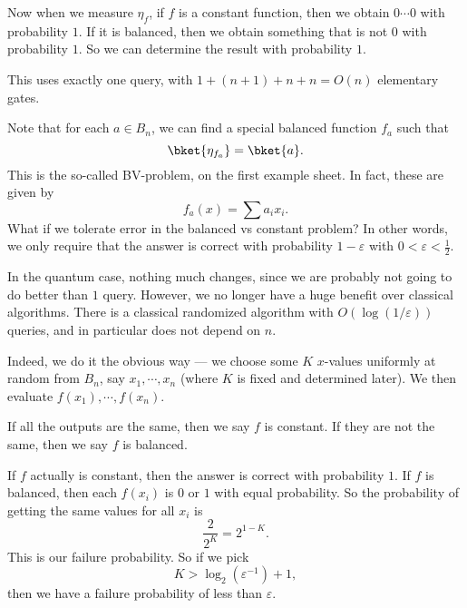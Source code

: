 \documentclass[a4paper]{article}
\makeatletter
\DeclareRobustCommand{\rvdots}{%
  \vbox{
    \baselineskip4\p@\lineskiplimit\z@
    \kern-\p@
    \hbox{.}\hbox{.}\hbox{.}
  }
}
\newcommand\addstate[3]{
  \pgfmathsetmacro{\y@y}{-#2 * 0.7};
  \pgfmathsetmacro{\x@x}{#3};
  \node [left] at (0, \y@y) {#1};
  \draw (0, \y@y) -- (\x@x, \y@y);
}
\newcommand\addoperator[3]{
  \node [draw, rectangle, fill=white] at (#3, -#2 * 0.7) {#1};
}
\newcommand\addbigoperator[5]{
  \pgfmathsetmacro{\y@s}{-#2 * 0.7 + 0.2};
  \pgfmathsetmacro{\y@t}{-#3 * 0.7 - 0.2};
  \pgfmathsetmacro{\x@s}{#4};
  \pgfmathsetmacro{\x@t}{#5};
  \pgfmathsetmacro{\x@c}{(\x@s + \x@t)/2};
  \pgfmathsetmacro{\y@c}{(\y@s + \y@t)/2};

  \draw [fill=white] (\x@s, \y@s) rectangle (\x@t, \y@t);
  \node at (\x@c, \y@c) {#1};
}
\makeatother
\begin{document}
\begin{eg}
  Now when we measure $\eta_f$, if $f$ is a constant function, then we obtain $0\cdots0$ with probability $1$. If it is balanced, then we obtain something that is not $0$ with probability $1$. So we can determine the result with probability $1$.
  \begin{center}
  \end{center}
  This uses exactly one query, with $1 + (n + 1) + n + n = O(n)$ elementary gates.

  Note that for each $a \in B_n$, we can find a special balanced function $f_a$ such that
  \[
    \bket{\eta_{f_a}} = \bket{a}.
  \]
  This is the so-called BV-problem, on the first example sheet. In fact, these are given by
  \[
    f_a(x) = \sum a_i x_i.
  \]
  What if we tolerate error in the balanced vs constant problem? In other words, we only require that the answer is correct with probability $1 - \varepsilon$ with $0 < \varepsilon < \frac{1}{2}$.

  In the quantum case, nothing much changes, since we are probably not going to do better than $1$ query. However, we no longer have a huge benefit over classical algorithms. There is a classical randomized algorithm with $O(\log(1/\varepsilon))$ queries, and in particular does not depend on $n$.

  Indeed, we do it the obvious way --- we choose some $K$ $x$-values uniformly at random from $B_n$, say $x_1, \cdots, x_n$ (where $K$ is fixed and determined later). We then evaluate $f(x_1), \cdots, f(x_n)$.

  If all the outputs are the same, then we say $f$ is constant. If they are not the same, then we say $f$ is balanced.

  If $f$ actually is constant, then the answer is correct with probability $1$. If $f$ is balanced, then each $f(x_i)$ is $0$ or $1$ with equal probability. So the probability of getting the same values for all $x_i$ is
  \[
    \frac{2}{2^K} = 2^{1 - K}.
  \]
  This is our failure probability. So if we pick
  \[
    K > \log_2 (\varepsilon^{-1}) + 1,
  \]
  then we have a failure probability of less than $\varepsilon$.
\end{eg}
\end{document}
